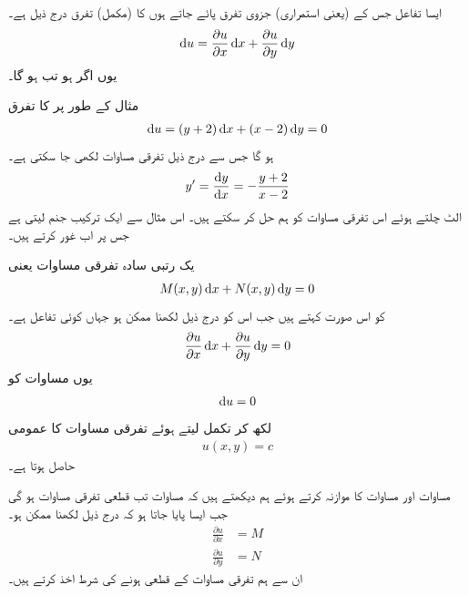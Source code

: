 ایسا تفاعل  جس کے  (یعنی استمراری) جزوی تفرق پائے جاتے ہوں کا (مکمل) تفرق درج ذیل ہے۔
\begin{align}
\dif u=\frac{\partial u}{\partial x}\dif x+\frac{\partial u}{\partial y}\dif y
\end{align}
یوں اگر  ہو تب  ہو گا۔

مثال کے طور پر  کا تفرق
\begin{align*}
\dif u=(y+2)\dif x+(x-2)\dif y=0
\end{align*}
ہو گا جس سے درج ذیل تفرقی مساوات لکھی جا سکتی ہے۔
\begin{align*}
y'=\frac{\dif y}{\dif x}=-\frac{y+2}{x-2}
\end{align*}
الٹ چلتے ہوئے اس تفرقی مساوات کو ہم حل کر سکتے ہیں۔ اس مثال سے ایک ترکیب جنم لیتی ہے جس پر اب غور کرتے ہیں۔

یک رتبی سادہ تفرقی مساوات  یعنی
\begin{align}\label{مساوات_سادہ_اول_قطعی_الف}
M(x,y)\dif x+N(x,y)\dif y=0
\end{align}
کو اس صورت  کہتے ہیں جب اس کو درج ذیل لکھنا ممکن ہو جہاں  کوئی تفاعل ہے۔
\begin{align}\label{مساوات_سادہ_اول_قطعی_ب}
\frac{\partial u}{\partial x}\dif x+\frac{\partial u}{\partial y}\dif y=0
\end{align}
یوں مساوات  کو
\begin{align}
\dif u=0
\end{align}
لکھ کر تکمل لیتے ہوئے تفرقی مساوات کا عمومی 
\begin{align}
u(x,y)=c
\end{align}
حاصل ہوتا ہے۔

مساوات  اور مساوات  کا موازنہ کرتے ہوئے ہم دیکھتے ہیں کہ مساوات  تب قطعی تفرقی مساوات ہو گی جب ایسا  پایا جاتا ہو کہ درج ذیل لکھنا ممکن ہو۔
\begin{align}
\frac{\partial u}{\partial x}&=M \label{مساوات_سادہ_اول_قطعی_شرط_الف}\\
\frac{\partial u}{\partial y}&=N\label{مساوات_سادہ_اول_قطعی_شرط_ب}
\end{align}
ان سے ہم تفرقی مساوات کے قطعی ہونے کی شرط اخذ کرتے ہیں۔

